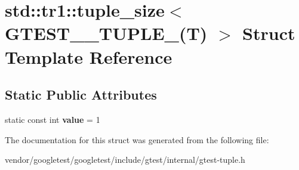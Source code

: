 \hypertarget{structstd_1_1tr1_1_1tuple__size_3_01GTEST__1__TUPLE___07T_08_01_4}{}\section{std\+:\+:tr1\+:\+:tuple\+\_\+size$<$ G\+T\+E\+S\+T\+\_\+\_\+\+T\+U\+P\+L\+E\+\_\+(T) $>$ Struct Template Reference}
\label{structstd_1_1tr1_1_1tuple__size_3_01GTEST__1__TUPLE___07T_08_01_4}
\subsection*{Static Public Attributes}
\begin{DoxyCompactItemize}
\item 
static const int {\bfseries value} = 1\hypertarget{structstd_1_1tr1_1_1tuple__size_3_01GTEST__1__TUPLE___07T_08_01_4_a02cb0da1163ad7eb74782b8f63420d5a}{}\label{structstd_1_1tr1_1_1tuple__size_3_01GTEST__1__TUPLE___07T_08_01_4_a02cb0da1163ad7eb74782b8f63420d5a}

\end{DoxyCompactItemize}


The documentation for this struct was generated from the following file\+:\begin{DoxyCompactItemize}
\item 
vendor/googletest/googletest/include/gtest/internal/gtest-\/tuple.\+h\end{DoxyCompactItemize}
